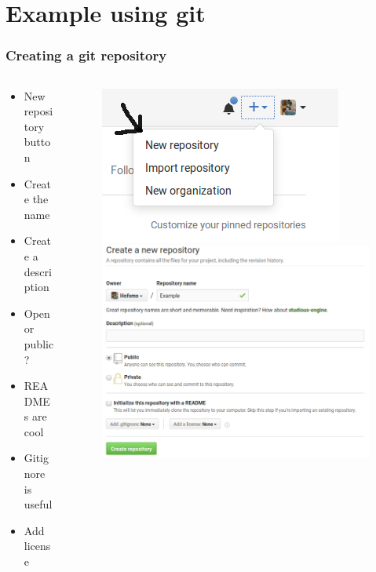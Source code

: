 \section[Using git]{Example using git}
\begin{frame}
	\frametitle{Creating a git repository}
	\begin{columns}
		\begin{column}{0.4\textwidth}
			\begin{itemize}[<+->]
				\item New repository button
				\item Create the name
				\item Create a description
				\item Open or public?
				\item READMEs are cool
				\item Gitignore is useful
				\item Add license
			\end{itemize}
		\end{column}
		\begin{column}{0.6\textwidth}
			\begin{figure}
				\centering
				\begin{overprint}
					\includegraphics[width=\textwidth]{./pictures/new_repository.png}
					\onslide<2>\includegraphics[width=\textwidth]{./pictures/rep_name.png}

\end{overprint}
\end{figure}
\end{column}
\end{columns}
\end{frame}
